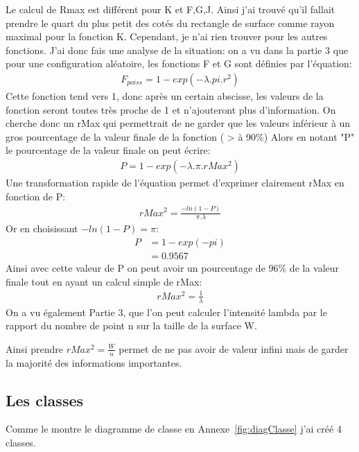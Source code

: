\documentclass[stage2a]{tnreport}
\begin{document}
Le calcul de Rmax est différent pour K et F,G,J. Ainsi j'ai trouvé qu'il fallait prendre le quart du plus petit des cotés du rectangle de surface comme rayon maximal pour la fonction K. Cependant, je n'ai rien trouver pour les autres fonctions.
J'ai donc fais une analyse de la situation: on a vu dans la partie 3 que pour une configuration aléatoire, les fonctions F et G sont définies par l'équation:
\begin{align*}
F_{poiss} = 1-exp(-\lambda.pi.r^2)
\end{align*}
Cette fonction tend vers 1, donc après un certain abscisse, les valeurs de la fonction seront toutes très proche de 1 et n'ajouteront plus d'information.
On cherche donc un rMax qui permettrait de ne garder que les valeurs inférieur à un gros pourcentage de la valeur finale de la fonction ( > à 90\%)
Alors en notant "P" le pourcentage de la valeur finale on peut écrire:
\begin{align*}
P = 1-exp(-\lambda.\pi.rMax^2)
\end{align*}
Une transformation rapide de l'équation permet d'exprimer clairement rMax en fonction de P:
\begin{align*}
rMax^2 = \frac{-ln(1-P)}{\pi.\lambda}
\end{align*}
Or en choisissant \begin{math}-ln(1-P)=\pi\end{math}:
\begin{align*}
P &= 1-exp(-pi)\\
&=0.9567
\end{align*}
Ainsi avec cette valeur de P on peut avoir un pourcentage de 96\% de la valeur finale tout en ayant un calcul simple de rMax:
\begin{align*}
rMax^2 = \frac{1}{\lambda}
\end{align*}
On a vu également Partie 3, que l'on peut calculer l'intensité lambda par le rapport du nombre de point n sur la taille de la surface W.

Ainsi prendre \begin{math} rMax^2 = \frac{W}{n} \end{math} permet de ne pas avoir de valeur infini mais de garder la majorité des informations importantes. 


\subsection{Les classes}

Comme le montre le diagramme de classe en Annexe~\ref{fig:diagClasse} j'ai créé 4 classes.
\end{document}
